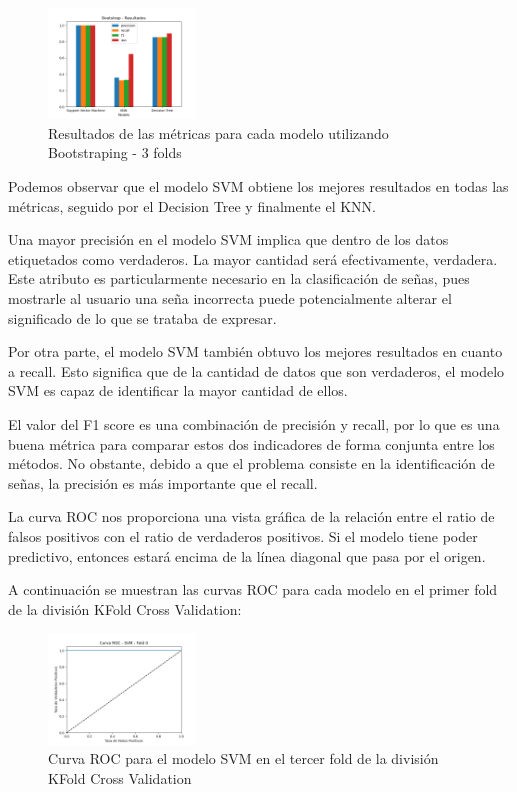 \documentclass[conference]{IEEEtran}
\begin{document}
\begin{figure}[ht]
    \centering
    \includegraphics[width=0.35\textwidth]{images/bs_results.png}
    \caption{Resultados de las métricas para cada modelo utilizando Bootstraping - 3 folds}
    \label{fig:bootstrap_results}
\end{figure}

Podemos observar que el modelo SVM obtiene los mejores resultados en todas las métricas, seguido por el Decision Tree y finalmente el KNN.

Una mayor precisión en el modelo SVM implica que dentro de los datos etiquetados como verdaderos. La mayor cantidad
será efectivamente, verdadera. Este atributo es particularmente necesario en la clasificación de señas, pues
mostrarle al usuario una seña incorrecta puede potencialmente alterar el significado de lo que se trataba de expresar.

Por otra parte, el modelo SVM también obtuvo los mejores resultados en cuanto a recall. Esto significa que
de la cantidad de datos que son verdaderos, el modelo SVM es capaz de identificar la mayor cantidad de ellos.

El valor del F1 score es una combinación de precisión y recall, por lo que es una buena métrica para comparar estos dos indicadores
de forma conjunta entre los métodos. No obstante, debido a que el problema consiste
en la identificación de señas, la precisión es más importante que el recall.

La curva ROC nos proporciona una vista gráfica de la relación entre el ratio de falsos positivos con el ratio de verdaderos positivos.
Si el modelo tiene poder predictivo, entonces estará encima de la línea diagonal que pasa por el origen.

A continuación se muestran las curvas ROC para cada modelo en el primer fold de la división KFold Cross Validation:

\begin{figure}[ht]
    \centering
    \includegraphics[width=0.35\textwidth]{images/plots/kfold_roc_svm_fold_0.png}
    \caption{Curva ROC para el modelo SVM en el tercer fold de la división KFold Cross Validation}
    \label{fig:kfold_roc_svm_fold_2}
\end{figure}
\end{document}
